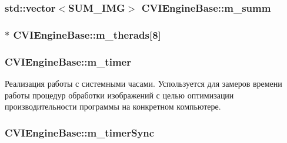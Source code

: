 \hypertarget{class_c_v_i_engine_base_a29b792994f8c587ebdd4296031032f68}{
\subsubsection[{m\+\_\+summ}]{\setlength{\rightskip}{0pt plus 5cm}std\+::vector$<${\bf S\+U\+M\+\_\+\+I\+M\+G}$>$ C\+V\+I\+Engine\+Base\+::m\+\_\+summ}}\label{class_c_v_i_engine_base_a29b792994f8c587ebdd4296031032f68}




\hypertarget{class_c_v_i_engine_base_a4fdf197fd70d474cf4365abba485c461}{
\subsubsection[{m\+\_\+therads}]{$\ast$ C\+V\+I\+Engine\+Base\+::m\+\_\+therads\mbox{[}8\mbox{]}}}\label{class_c_v_i_engine_base_a4fdf197fd70d474cf4365abba485c461}




\hypertarget{class_c_v_i_engine_base_a928c4511d2e46b9cd4b7c9b3b7322855}{
\subsubsection[{m\+\_\+timer}]{ C\+V\+I\+Engine\+Base\+::m\+\_\+timer}}\label{class_c_v_i_engine_base_a928c4511d2e46b9cd4b7c9b3b7322855}


Реализация работы с системными часами. Успользуется для замеров времени работы процедур обработки изображений с целью оптимизации производительности программы на конкретном компьютере. 

\hypertarget{class_c_v_i_engine_base_a8709ba629c654585cc38d13ccf3a23b8}{
\subsubsection[{m\+\_\+timer\+Sync}]{ C\+V\+I\+Engine\+Base\+::m\+\_\+timer\+Sync}}\label{class_c_v_i_engine_base_a8709ba629c654585cc38d13ccf3a23b8}


